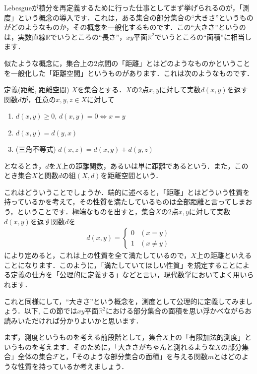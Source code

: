Lebesgueが積分を再定義するために行った仕事としてまず挙げられるのが，「測度」という概念の導入です．これは，ある集合の部分集合の“大きさ”というものがどのようなものか，その概念を一般化するものです．この“大きさ”というのは，実数直線$\mathbb{R}$でいうところの“長さ”，$xy$平面$\mathbb{R}^2$でいうところの“面積”に相当します．
\par 似たような概念に，集合上の2点間の「距離」とはどのようなものかということを一般化した「距離空間」というものがあります．これは次のようなものです．
\begin{itembox}[l]{定義(距離, 距離空間)}
$X$を集合とする．$X$の2点$x,y$に対して実数$d(x,y)$を返す関数$d$が，任意の$x,y,z\in X$に対して
\begin{enumerate}
\item $d(x,y) \ge 0$, $d(x,y)=0 \Leftrightarrow x=y$
\item $d(x,y)=d(y,x)$
\item (三角不等式) $d(x,z)=d(x,y)+d(y,z)$
\end{enumerate}
となるとき，$d$を$X$上の距離関数，あるいは単に距離であるという．また，このとき集合$X$と関数$d$の組$(X,d)$を距離空間という．
\end{itembox}
\par これはどういうことでしょうか．端的に述べると，「距離」とはどういう性質を持っているかを考えて，その性質を満たしているものは全部距離と言ってしまおう，ということです．極端なものを出すと，集合$X$の2点$x,y$に対して実数$d(x,y)$を返す関数$d$を
\begin{eqnarray}
d(x,y)=\begin{cases}
0 & (x=y) \nonumber \\
1 & (x \neq y) \nonumber
\end{cases}
\end{eqnarray}
により定めると，これは上の性質を全て満たしているので，$X$上の距離といえることになります．このように，「満たしていてほしい性質」を規定することによる定義の仕方を「公理的に定義する」などと言い，現代数学においてよく用いられます．
\par これと同様にして，“大きさ”という概念を，測度として公理的に定義してみましょう．以下, この節では$xy$平面$\mathbb{R}^2$における部分集合の面積を思い浮かべながらお読みいただければ分かりよいかと思います．
\par まず，測度というものを考える前段階として，集合$X$上の「有限加法的測度」というものを考えます．そのために，「大きさがちゃんと測れるような$X$の部分集合」全体の集合$\mathcal{F}$と，「そのような部分集合の面積」を与える関数$m$とはどのような性質を持っているか考えましょう．
